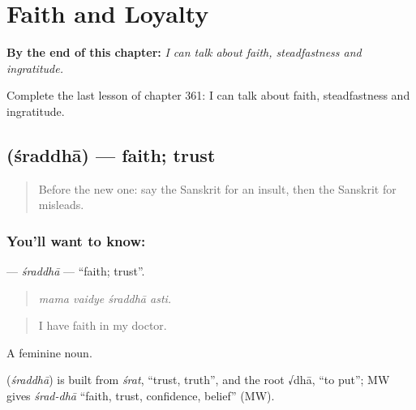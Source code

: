 
\chapter{Faith and Loyalty}
\label{ch:sa-faith-and-loyalty}

\begin{chapteropening}
\textbf{By the end of this chapter:} \emph{I can talk about faith, steadfastness and ingratitude.}

Complete the last lesson of chapter 361: I can talk about faith, steadfastness and ingratitude.
\end{chapteropening}

\section[\texorpdfstring{\sk{श्रद्धा} (śraddhā)}{श्रद्धा (śraddhā)}]{ (śraddhā) — faith; trust}

\label{lesson:SA-C361-sraddha}



\begin{quote}
Before the new one: say the Sanskrit for an insult, then the Sanskrit for misleads.
\end{quote}

\subsection*{You'll want to know: }
\textbf{} — \emph{śraddhā} — \textquotedblleft{}faith; trust\textquotedblright{}.

\begin{quote}
   
\end{quote}

\begin{quote}
\emph{mama vaidye śraddhā asti.}
\end{quote}

\begin{quote}
I have faith in my doctor.
\end{quote}

A feminine noun.

\begin{cousinweb}
\textbf{} (\emph{śraddhā}) is built from \emph{śrat}, \textquotedblleft{}trust, truth\textquotedblright{}, and the root √dhā, \textquotedblleft{}to put\textquotedblright{}; MW gives \emph{śrad-dhā} \textquotedblleft{}faith, trust, confidence, belief\textquotedblright{} (MW).
\end{cousinweb}

